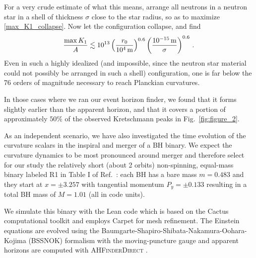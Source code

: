 \documentclass[floats,floatfix,showpacs,amssymb,prd,twocolumn,superscriptaddress,nofootinbib,nolongbibliography,reprint]{revtex4-2}
\newcommand{\be}{\begin{equation}}
\newcommand{\ee}{\end{equation}}
\def\be{\begin{equation}}
\def\ee{\end{equation}}
\begin{document}
For a very crude estimate of what this means, arrange all neutrons in a neutron star in a shell of thickness $\sigma$ close to the star radius, so as to maximize \eqref{max_K1_collapse}. Now let the configuration collapse, and find
%
\be
\frac{\max{K_1}}{A}\lesssim 10^{13}\left(\frac{r_0}{10^4\,{\rm m}}\right)^{0.6} \left( \frac{10^{-15}\,{\rm m}}{\sigma}\right)^{0.6}\,.
\ee
%
Even in such a highly idealized (and impossible, since the neutron star material could not possibly be arranged in such a shell) configuration, one is far below the 76 orders of magnitude necessary to reach Planckian curvatures.



In those cases where we ran our event horizon finder, we found that it forms slightly earlier than the apparent horizon, and that it covers a portion of approximately $50 \% $ of the observed Kretschmann peaks in Fig.~\ref{fig:figure_2}.

As an independent scenario, we have also investigated the
time evolution of the curvature scalars in the inspiral
and merger of a BH binary. We expect the
curvature dynamics to be most pronounced around merger and
therefore select for our study the relatively short
(about 2 orbits) non-spinning, equal-mass binary
labeled R1 in Table I of Ref.~\cite{Baker:2006yw}:
each BH has a bare mass $m=0.483$ and they start at
$x=\pm 3.257$ with tangential momentum $P_y=\pm 0.133$
resulting in a total BH mass of $M=1.01$ (all in code units).

We simulate this binary with the {\sc Lean} code
\cite{Sperhake:2006cy} which is based on the
{\sc Cactus} computational toolkit \cite{Goodale2002}
and employs {\sc Carpet} \cite{Schnetter:2003rb} for mesh refinement.
The Einstein equations are evolved using the
Baumgarte-Shapiro-Shibata-Nakamura-Oohara-Kojima
(BSSNOK) formalism
\cite{Nakamura:1987zz,Shibata:1995we,Baumgarte:1998te}
with the moving-puncture gauge
\cite{Campanelli:2005dd,Baker:2005vv}
and apparent horizons are computed with \textsc{AHFinderDirect}
\cite{Thornburg:1995cp,Thornburg:2003sf}.
\end{document}
